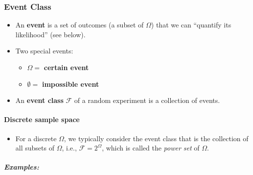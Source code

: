 \subsubsection{Event Class}

\begin{itemize}
\item An \textbf{event} is a set of outcomes (a subset of $\Omega$) that we can ``quantify its likelihood'' (see below).
\item Two special events:

\begin{itemize}
\item $\Omega =$ \textbf{certain event}
\item $\emptyset =$ \textbf{impossible event}
\end{itemize}


\item An \textbf{event class} $\mathcal{F}$ of a random experiment is a collection of events.
\end{itemize}

\paragraph{Discrete sample space}

\begin{itemize}
\item For a discrete $\Omega$, we typically consider the event class that is the collection of all subsets of $\Omega$, i.e., $\mathcal{F} = 2^{\Omega}$, which is called the \textit{power set} of $\Omega$.
\end{itemize}

\subparagraph{Examples:}

